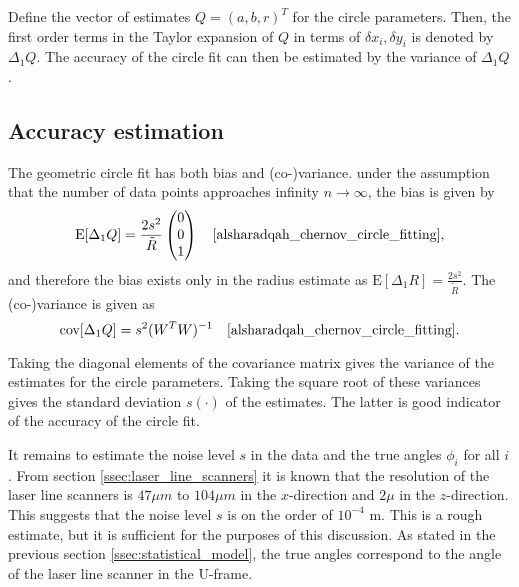 Define the vector of estimates $Q = (a, b, r)^T$ for the circle parameters. Then, the first order terms in the Taylor expansion of $Q$ in terms of $\delta x_i, \delta y_i$ is denoted by $\Delta_1Q$. The accuracy of the circle fit can then be estimated by the variance of $\Delta_1Q$ \cite[section 2]{alsharadqah_chernov_circle_fitting}.

\subsection{Accuracy estimation}
The geometric circle fit has both bias and (co-)variance. under the assumption that the number of data points approaches infinity $n \rightarrow \infty$, the bias is given by
\begin{equation}
    \text{E}[\Delta_1 Q] = \frac{2s^2}{\tilde{R}} \begin{pmatrix} 0 \\ 0 \\ 1 \end{pmatrix} \quad \text{\cite[equation 6.14]{alsharadqah_chernov_circle_fitting}},
    \label{eq:circle_fit_bias}
\end{equation}
and therefore the bias exists only in the radius estimate as $\text{E}[\Delta_1 R] =\frac{2s^2}{\tilde{R}}$. The (co-)variance is given as
\begin{equation}
    \text{cov}[\Delta_1 Q] = s^2 (W^T W)^{-1} \quad \text{\cite[equation 8.12]{alsharadqah_chernov_circle_fitting}}.
    \label{eq:circle_fit_variance}
\end{equation}

Taking the diagonal elements of the covariance matrix gives the variance of the estimates for the circle parameters. Taking the square root of these variances gives the standard deviation $s(\cdot)$ of the estimates. The latter is good indicator of the accuracy of the circle fit.

It remains to estimate the noise level $s$ in the data and the true angles $\phi_i$ for all $i$. From section \ref{ssec:laser_line_scanners} it is known that the resolution of the laser line scanners is $47 \mu m$ to $104 \mu m$ in the $x$-direction and $2 \mu$ in the $z$-direction. This suggests that the noise level $s$ is on the order of $10^{-4}$ m. This is a rough estimate, but it is sufficient for the purposes of this discussion. As stated in the previous section \ref{ssec:statistical_model}, the true angles correspond to the angle of the laser line scanner in the U-frame.

